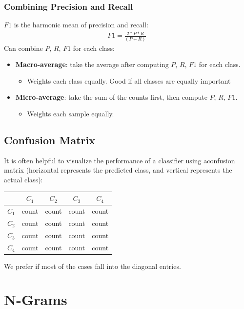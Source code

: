\documentclass{article}
\begin{document}
\subsubsection{Combining Precision and Recall}
$F1$ is the harmonic mean of precision and recall:
\begin{align}
    F1 = \frac{2 * P * R}{(P + R)}
\end{align}
Can combine $P$, $R$, $F1$ for each class:
\begin{itemize}
    \item \textbf{Macro-average}: take the average after computing $P$, $R$, $F1$ for each class.
    \begin{itemize}
        \item Weights each class equally. Good if all classes are equally important
    \end{itemize}
    \item \textbf{Micro-average}: take the sum of the counts first, then compute $P$, $R$, $F1$.
    \begin{itemize}
        \item Weights each sample equally.
    \end{itemize}
\end{itemize}
\subsection{Confusion Matrix}
It is often helpful to visualize the performance of a classifier using aconfusion matrix (horizontal represents the predicted class, and vertical represents the actual class):
\begin{center}
\begin{tabular}{|c|c|c|c|c|}
     \hline
     & $C_1$ & $C_2$ & $C_3$ & $C_4$\\
     \hline
     $C_1$ & count & count & count & count\\
     \hline
     $C_2$ & count & count & count & count\\
     \hline
     $C_3$ & count & count & count & count\\
     \hline
     $C_4$ & count & count & count & count\\
     \hline
\end{tabular}
\end{center}
We prefer if most of the cases fall into the diagonal entries.
\section{N-Grams}
\end{document}
